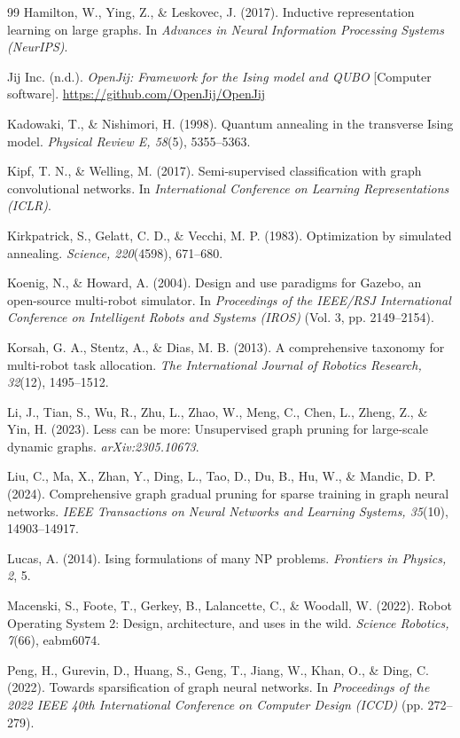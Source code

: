 \begin{singlespace}
\begin{thebibliography}{99}
 Hamilton, W., Ying, Z., \& Leskovec, J. (2017).
Inductive representation learning on large graphs. In \emph{Advances in
Neural Information Processing Systems (NeurIPS)}.

 Jij Inc. (n.d.). \emph{OpenJij: Framework for the Ising
model and QUBO} [Computer software].
\url{https://github.com/OpenJij/OpenJij}

 Kadowaki, T., \& Nishimori, H. (1998). Quantum
annealing in the transverse Ising model. \emph{Physical Review E, 58}(5),
5355--5363.

 Kipf, T. N., \& Welling, M. (2017). Semi-supervised
classification with graph convolutional networks. In \emph{International
Conference on Learning Representations (ICLR)}.

 Kirkpatrick, S., Gelatt, C. D., \& Vecchi, M. P.
(1983). Optimization by simulated annealing. \emph{Science, 220}(4598),
671--680.

 Koenig, N., \& Howard, A. (2004). Design and use
paradigms for Gazebo, an open-source multi-robot simulator. In
\emph{Proceedings of the IEEE/RSJ International Conference on Intelligent
Robots and Systems (IROS)} (Vol. 3, pp. 2149--2154).

 Korsah, G. A., Stentz, A., \& Dias, M. B. (2013). A
comprehensive taxonomy for multi-robot task allocation. \emph{The
International Journal of Robotics Research, 32}(12), 1495--1512.

 Li, J., Tian, S., Wu, R., Zhu, L., Zhao, W., Meng, C.,
Chen, L., Zheng, Z., \& Yin, H. (2023). Less can be more: Unsupervised graph
pruning for large-scale dynamic graphs. \emph{arXiv:2305.10673}.

 Liu, C., Ma, X., Zhan, Y., Ding, L., Tao, D., Du, B.,
Hu, W., \& Mandic, D. P. (2024). Comprehensive graph gradual pruning for
sparse training in graph neural networks. \emph{IEEE Transactions on Neural
Networks and Learning Systems, 35}(10), 14903--14917.

 Lucas, A. (2014). Ising formulations of many NP problems.
\emph{Frontiers in Physics, 2}, 5.

 Macenski, S., Foote, T., Gerkey, B., Lalancette, C.,
\& Woodall, W. (2022). Robot Operating System 2: Design, architecture, and
uses in the wild. \emph{Science Robotics, 7}(66), eabm6074.

 Peng, H., Gurevin, D., Huang, S., Geng, T., Jiang, W.,
Khan, O., \& Ding, C. (2022). Towards sparsification of graph neural
networks. In \emph{Proceedings of the 2022 IEEE 40th International
Conference on Computer Design (ICCD)} (pp. 272--279).


\end{thebibliography}
\end{singlespace}
